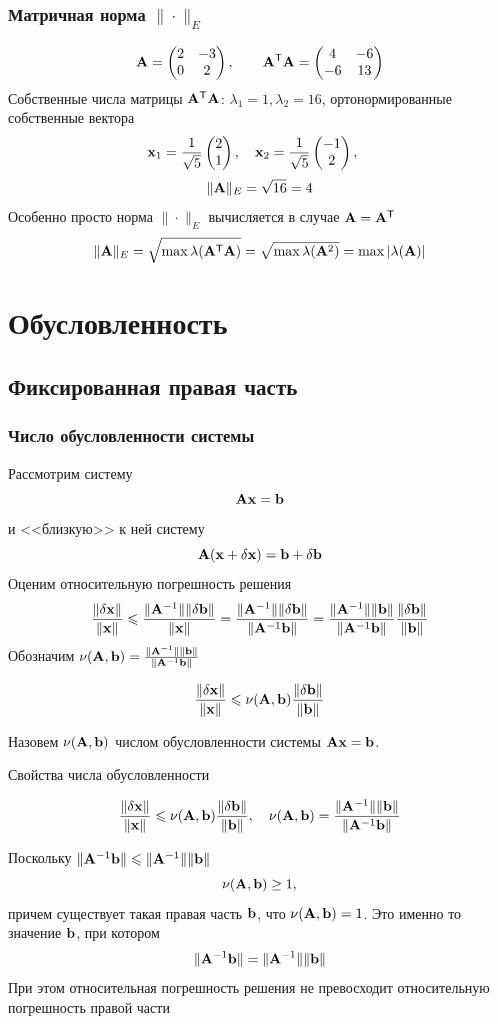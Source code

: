 \documentclass[apectratio=43,unicode]{beamer}
\begin{document}
\begin{frame}
\frametitle{Матричная норма $\|\cdot\|_E$}
	$$
	{\mathbf{A}} = \begin{pmatrix}
		2&-3\\
		0&2
	\end{pmatrix},\qquad
	{\mathbf{A}}^{\mathsf{T}}{\mathbf{A}} = \begin{pmatrix}
		4&-6\\
		-6&13
	\end{pmatrix}
	$$
	Собственные числа матрицы ${\mathbf{A}}^{\mathsf{T}}{\mathbf{A}}$: $\lambda_1 = 1, \lambda_2 = 16$, ортонормированные собственные вектора
	$$
	{\mathbf{x}}_1 = \frac{1}{\sqrt{5}}\begin{pmatrix}
		2\\1
	\end{pmatrix}, \quad
	{\mathbf{x}}_2 = \frac{1}{\sqrt{5}}\begin{pmatrix}
		-1\\2
	\end{pmatrix}, \quad
	$$
	$$
	\|{\mathbf{A}}\|_E = \sqrt{16} = 4
	$$
	Особенно просто норма $\|\cdot\|_E$ вычисляется в случае ${\mathbf{A}} = {\mathbf{A}}^{\mathsf{T}}$
	$$
	\|{\mathbf{A}}\|_E = \sqrt{\max\lambda({\mathbf{A}}^{\mathsf{T}}{\mathbf{A}})} = \sqrt{\max\lambda({\mathbf{A}}^2)} = \max|\lambda({\mathbf{A}})|
	$$
\end{frame}

\section{Обусловленность}
\subsection{Фиксированная правая часть}
\begin{frame}
\frametitle{Число обусловленности системы}
	Рассмотрим систему
	$$
	{\mathbf{A}}{\mathbf{x}} = {\mathbf{b}}
	$$
	и <<близкую>> к ней систему
	$$
	{\mathbf{A}}({\mathbf{x}}+\delta {\mathbf{x}}) = {\mathbf{b}} + \delta {\mathbf{b}}
	$$
	Оценим относительную погрешность решения
	$$
	\frac{\|\delta{\mathbf{x}}\|}{\|{\mathbf{x}}\|} \leqslant \frac{\|{\mathbf{A}}^{-1}\|\|\delta {\mathbf{b}}\|}{\|{\mathbf{x}}\|} =
	\frac{\|{\mathbf{A}}^{-1}\|\|\delta {\mathbf{b}}\|}{\|{\mathbf{A}}^{-1}{\mathbf{b}}\|} =
	\frac{\|{\mathbf{A}}^{-1}\|\|{\mathbf{b}}\|}{\|{\mathbf{A}}^{-1}{\mathbf{b}}\|}\frac{\|\delta {\mathbf{b}}\|}{\|{\mathbf{b}}\|}
	$$
	Обозначим $\nu({\mathbf{A}},{\mathbf{b}}) = \frac{\|{\mathbf{A}}^{-1}\|\|{\mathbf{b}}\|}{\|{\mathbf{A}}^{-1}{\mathbf{b}}\|}$
	\begin{block}{}
	$$\frac{\|\delta{\mathbf{x}}\|}{\|{\mathbf{x}}\|} \leqslant \nu({\mathbf{A}},{\mathbf{b}}) \frac{\|\delta {\mathbf{b}}\|}{\|{\mathbf{b}}\|}$$
	\end{block}
	Назовем $\nu({\mathbf{A}}, {\mathbf{b}})$ числом обусловленности системы ${\mathbf{A}}{\mathbf{x}} = {\mathbf{b}}$.
\end{frame}

\begin{frame}{Свойства числа обусловленности}
	\begin{block}{}
	$$\frac{\|\delta{\mathbf{x}}\|}{\|{\mathbf{x}}\|} \leqslant \nu({\mathbf{A}},{\mathbf{b}}) \frac{\|\delta {\mathbf{b}}\|}{\|{\mathbf{b}}\|}, \quad \nu({\mathbf{A}},{\mathbf{b}}) = \frac{\|{\mathbf{A}}^{-1}\|\|{\mathbf{b}}\|}{\|{\mathbf{A}}^{-1}{\mathbf{b}}\|}$$
	\end{block}
	Поскольку $\|{\mathbf{A}}^{-1}{\mathbf{b}}\| \leqslant \|{\mathbf{A}}^{-1}\|\|{\mathbf{b}}\|$
	$$
	\nu({\mathbf{A}},{\mathbf{b}}) \geq 1,
	$$
	причем существует такая правая часть ${\mathbf{b}}$, что $\nu({\mathbf{A}},{\mathbf{b}}) = 1$. Это именно то значение ${\mathbf{b}}$, при котором
	$$
	\| {\mathbf{A}}^{-1} {\mathbf{b}} \| = \|{\mathbf{A}}^{-1}\| \|{\mathbf{b}}\|
	$$
	При этом относительная погрешность решения не превосходит относительную погрешность правой части
\end{frame}
\end{document}
